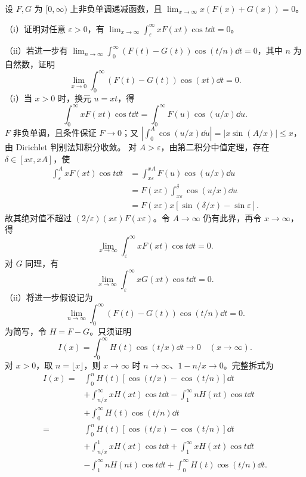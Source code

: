 设 $F,G$ 为 $[0,\infty)$ 上非负单调递减函数，且
$\lim_{x\to\infty}x(F(x)+G(x))=0$。

（i）证明对任意 $\varepsilon>0$，有 $\lim_{x\to\infty}\int_\varepsilon^\infty xF(xt)\cos t\dd t=0$。

（ii）若进一步有 $\lim_{n\to\infty}\int_0^\infty(F(t)-G(t))\cos(t/n)\dd t=0$，其中 $n$ 为自然数，证明
\[
\lim_{x\to0}\int_0^\infty(F(t)-G(t))\cos(xt)\dd t=0.
\]
\prooftext （i）当 $x>0$ 时，换元 $u=xt$，得
\[
\int_0^\infty xF(xt)\cos t\dd t=\int_0^\infty F(u)\cos(u/x)\dd u.
\]
$F$ 非负单调，且条件保证 $F\to0$；又
$|\int_0^A\cos(u/x)\dd u|=|x\sin(A/x)|\le x$，由 Dirichlet 判别法知积分收敛。
对 $A>\varepsilon$，由第二积分中值定理，存在 $\delta\in[x\varepsilon,xA]$，使
\begin{align*}
\int_\varepsilon^A xF(xt)\cos t\dd t
&=\int_{x\varepsilon}^{xA}F(u)\cos(u/x)\dd u\\
&=F(x\varepsilon)\int_{x\varepsilon}^{\delta}\cos(u/x)\dd u\\
&=F(x\varepsilon)x[\sin(\delta/x)-\sin\varepsilon].
\end{align*}
故其绝对值不超过 $(2/\varepsilon)(x\varepsilon)F(x\varepsilon)$。令 $A\to\infty$ 仍有此界，再令 $x\to\infty$，得
\begin{equation}
\lim_{x\to\infty}\int_\varepsilon^\infty xF(xt)\cos t\dd t=0.\tag{6.5.1}
\end{equation}
对 $G$ 同理，有
\begin{equation}
\lim_{x\to\infty}\int_\varepsilon^\infty xG(xt)\cos t\dd t=0.\tag{6.5.2}
\end{equation}
（ii）将进一步假设记为
\begin{equation}
\lim_{n\to\infty}\int_0^\infty(F(t)-G(t))\cos(t/n)\dd t=0.\tag{6.5.3}
\end{equation}
为简写，令 $H=F-G$。只须证明
\begin{equation}
I(x)=\int_0^\infty H(t)\cos(t/x)\dd t\longrightarrow0\quad(x\to\infty).\tag{6.5.4}
\end{equation}
对 $x>0$，取 $n=\lfloor x\rfloor$，则 $x\to\infty$ 时 $n\to\infty$、$1-n/x\to0$。完整拆式为
\begin{equation}
\begin{aligned}
I(x)={}&\int_0^nH(t)[\cos(t/x)-\cos(t/n)]\dd t\\
&+\int_{n/x}^\infty xH(xt)\cos t\dd t-\int_1^\infty nH(nt)\cos t\dd t\\
&+\int_0^\infty H(t)\cos(t/n)\dd t\\
={}&\int_0^nH(t)[\cos(t/x)-\cos(t/n)]\dd t\\
&+\int_{n/x}^1xH(xt)\cos t\dd t+\int_1^\infty xH(xt)\cos t\dd t\\
&-\int_1^\infty nH(nt)\cos t\dd t+\int_0^\infty H(t)\cos(t/n)\dd t.
\end{aligned}\tag{6.5.5}
\end{equation}
